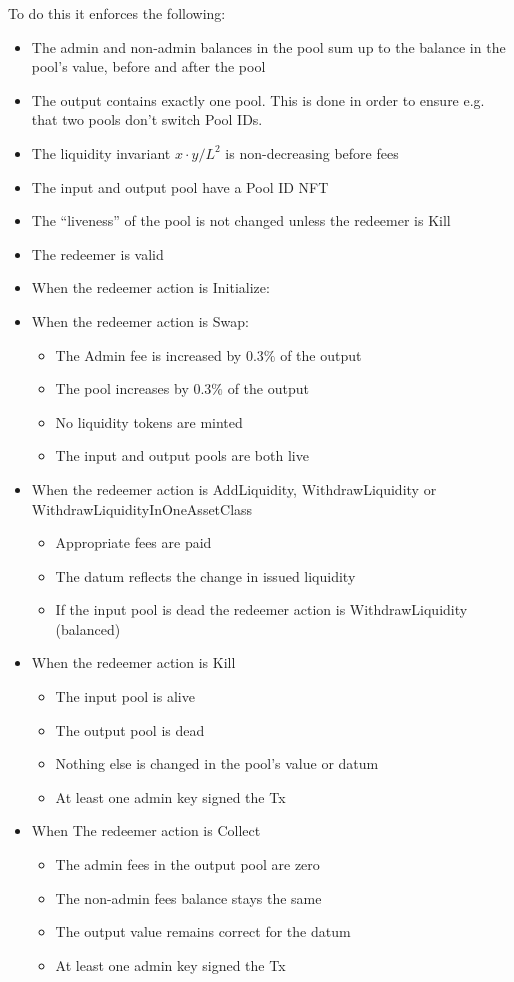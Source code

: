 \documentclass{article}
\begin{document}
To do this it enforces the following: 
\begin{itemize}
  \item The admin and non-admin balances in the pool sum up to the balance in
    the pool's value, before and after the pool
  \item The output contains exactly one pool. This is done in order to ensure
    e.g. that two pools don't switch Pool IDs.
  \item The liquidity invariant $x \cdot y / L^2$ is non-decreasing before fees
  \item The input and output pool have a Pool ID NFT
  \item The ``liveness'' of the pool is not changed unless the redeemer is Kill
  \item The redeemer is valid 
  \item When the redeemer action is Initialize: 
  \item When the redeemer action is Swap:
    \begin{itemize}
      \item The Admin fee is increased by $0.3\%$ of the output
      \item The pool increases by $0.3\%$ of the output
      \item No liquidity tokens are minted
      \item The input and output pools are both live
    \end{itemize}
  \item When the redeemer action is AddLiquidity, WithdrawLiquidity or
    WithdrawLiquidityInOneAssetClass
    \begin{itemize}
      \item Appropriate fees are paid
      \item The datum reflects the change in issued liquidity
      \item If the input pool is dead the redeemer action is WithdrawLiquidity
        (balanced)
    \end{itemize}
  \item When the redeemer action is Kill
  	\begin{itemize}
      \item The input pool is alive
  		\item The output pool is dead
  		\item Nothing else is changed in the pool's value or datum
  		\item At least one admin key signed the Tx
  	\end{itemize}
  \item When The redeemer action is Collect
  	\begin{itemize}
  		\item The admin fees in the output pool are zero
  		\item The non-admin fees balance stays the same
  		\item The output value remains correct for the datum
  		\item At least one admin key signed the Tx
  	\end{itemize}
\end{itemize}
\end{document}
